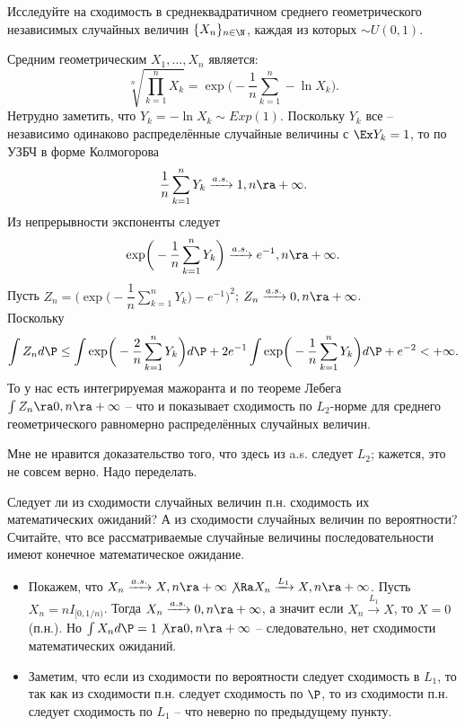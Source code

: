 \begin{problem}
    Исследуйте на сходимость в среднеквадратичном среднего геометрического независимых случайных величин $\{X_n\}_{n \in \N}$, каждая из которых $\sim U(0, 1)$.
\end{problem}
\begin{solution}
    Средним геометрическим $X_1, \ldots, X_n$ является:
    \[
        \sqrt[n]{\prod_{k = 1}^n X_k} = \exp\biggr(-{\dfrac{1}{n}\sum\limits_{k = 1}^n -\ln X_k}\biggr).
    \]
    Нетрудно заметить, что $Y_k = -\ln X_k \sim Exp(1)$.
    Поскольку $Y_k$ все -- независимо одинаково распределённые случайные величины с $\Ex Y_k = 1$, то по УЗБЧ в форме Колмогорова
    \[
        \dfrac{1}{n}\sum\limits_{k = 1}^n Y_k \xrightarrow{a.s.} 1, n \ra +\infty.
    \]
    Из непрерывности экспоненты следует
    \[
        \exp\biggr(-\dfrac{1}{n}\sum\limits_{k = 1}^n Y_k\biggr) \xrightarrow{a.s.} e^{-1}, n \ra +\infty.
    \]
    Пусть $Z_n = \biggr(\exp\biggr(-\dfrac{1}{n}\sum\limits_{k = 1}^n Y_k\biggr) - e^{-1}\biggr)^2$; $Z_n \xrightarrow{a.s.} 0, n \ra +\infty$. \\
    Поскольку
    \[
        \int Z_{n}d\P \leq \int \exp \biggr(-\dfrac{2}{n}\sum\limits_{k = 1}^n Y_k\biggr)d\P + 2e^{-1}\int \exp \biggr(-\dfrac{1}{n}\sum\limits_{k = 1}^n Y_k\biggr)d\P + e^{-2} < +\infty.
    \]
    То у нас есть интегрируемая мажоранта и по теореме Лебега $\int Z_n \ra 0, n \ra +\infty$ -- что и показывает сходимость по $L_2$-норме для среднего геометрического равномерно распределённых случайных величин.
\end{solution}
\begin{note}
    Мне не нравится доказательство того, что здесь из a.s. следует $L_2$; кажется, это не совсем верно. Надо переделать.
\end{note}
\begin{problem}
    Следует ли из сходимости случайных величин п.н. сходимость их математических ожиданий?
    А из сходимости случайных величин по вероятности?
    Считайте, что все рассматриваемые случайные величины последовательности имеют конечное математическое ожидание.
\end{problem}
\begin{solution} \leavevmode
    \begin{itemize}
        \item Покажем, что $X_n \xrightarrow{a.s.} X, n \ra +\infty \not\Ra X_n \xrightarrow{L_1} X, n \ra +\infty$.
        Пусть $X_n = n I_{[0, 1/n)}$.
        Тогда $X_n \xrightarrow{a.s.} 0, n \ra +\infty$, а значит если $X_n \xrightarrow{L_1} X$, то $X = 0$ (п.н.).
        Но $\int X_n d\P = 1 \not\ra 0, n \ra +\infty$ -- следовательно, нет сходимости математических ожиданий.
        \item Заметим, что если из сходимости по вероятности следует сходимость в $L_1$, то так как из сходимости п.н. следует сходимость по $\P$, то из сходимости п.н. следует сходимость по $L_1$ -- что неверно по предыдущему пункту.
    \end{itemize}
\end{solution}